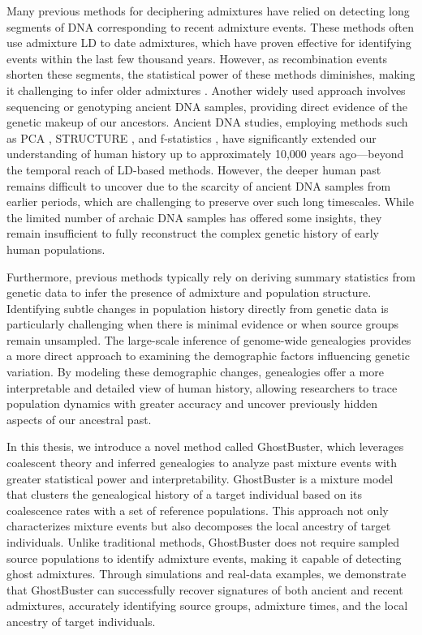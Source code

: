 Many previous methods for deciphering admixtures have relied on detecting long segments of DNA corresponding to recent admixture events. These methods often use admixture LD to date admixtures, which have proven effective for identifying events within the last few thousand years. However, as recombination events shorten these segments, the statistical power of these methods diminishes, making it challenging to infer older admixtures \cite{hellenthal2014genetic, loh2013inferring, moorjani2011history, patterson2012ancient}. Another widely used approach involves sequencing or genotyping ancient DNA samples, providing direct evidence of the genetic makeup of our ancestors. Ancient DNA studies, employing methods such as PCA \cite{Patterson2006}, STRUCTURE \cite{Pritchard2000}, and f-statistics \cite{reich2009reconstructing,reich2012reconstructing,patterson2012ancient,haak2015massive,durand2011testing}, have significantly extended our understanding of human history up to approximately 10,000 years ago—beyond the temporal reach of LD-based methods. However, the deeper human past remains difficult to uncover due to the scarcity of ancient DNA samples from earlier periods, which are challenging to preserve over such long timescales. While the limited number of archaic DNA samples has offered some insights, they remain insufficient to fully reconstruct the complex genetic history of early human populations.

Furthermore, previous methods typically rely on deriving summary statistics from genetic data to infer the presence of admixture and population structure. Identifying subtle changes in population history directly from genetic data is particularly challenging when there is minimal evidence or when source groups remain unsampled. The large-scale inference of genome-wide genealogies provides a more direct approach to examining the demographic factors influencing genetic variation. By modeling these demographic changes, genealogies offer a more interpretable and detailed view of human history, allowing researchers to trace population dynamics with greater accuracy and uncover previously hidden aspects of our ancestral past.

In this thesis, we introduce a novel method called GhostBuster, which leverages coalescent theory and inferred genealogies to analyze past mixture events with greater statistical power and interpretability. GhostBuster is a mixture model that clusters the genealogical history of a target individual based on its coalescence rates with a set of reference populations. This approach not only characterizes mixture events but also decomposes the local ancestry of target individuals. Unlike traditional methods, GhostBuster does not require sampled source populations to identify admixture events, making it capable of detecting ghost admixtures. Through simulations and real-data examples, we demonstrate that GhostBuster can successfully recover signatures of both ancient and recent admixtures, accurately identifying source groups, admixture times, and the local ancestry of target individuals.

